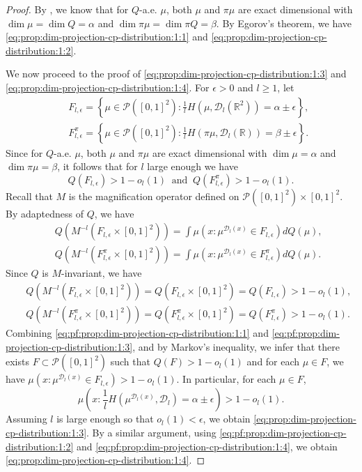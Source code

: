 \documentclass[a4paper,11pt]{amsart}
\theoremstyle{definition}
\numberwithin{equation}{section}
\def\D{\mathcal{D}}
\def\cP{\mathcal P}
\def\R{\mathbb R}
\begin{document}
\begin{proof}
By \cite[Theorem 1.22]{Hochman2010-fractal-distributions}, we know that for $Q$-a.e. $\mu$,  both $\mu$ and $\pi\mu$ are exact dimensional with $\dim \mu=\dim Q=\alpha$ and $\dim \pi\mu=\dim \pi Q=\beta$.   By Egorov's theorem, we have \eqref{eq:prop:dim-projection-cp-distribution:1:1} and \eqref{eq:prop:dim-projection-cp-distribution:1:2}. 

We now proceed to the proof of \eqref{eq:prop:dim-projection-cp-distribution:1:3} and \eqref{eq:prop:dim-projection-cp-distribution:1:4}.   For $\epsilon>0$ and $l\ge 1$, let 
\begin{eqnarray*}
& & F_{l,\epsilon} = \left\{ \mu\in \cP([0,1]^2): \frac{1}{l}H(\mu,\D_l(\R^2)) = \alpha\pm \epsilon  \right\},\\
& & F_{l,\epsilon}^\pi = \left\{ \mu\in \cP([0,1]^2): \frac{1}{l}H(\pi\mu,\D_l(\R)) = \beta\pm \epsilon  \right\}.
\end{eqnarray*}
Since for $Q$-a.e. $\mu$, both $\mu$ and $\pi\mu$ are exact dimensional with $\dim \mu=\alpha$ and $\dim \pi\mu=\beta$,  it follows that for $l$ large enough we have  
\[
Q(F_{l,\epsilon})>1-o_{l}(1) \  \textrm{ and }  \  Q(F_{l,\epsilon}^\pi)>1-o_{l}(1).
\]
Recall that $M$ is the magnification operator defined on $\cP([0,1]^2)\times [0,1]^2$.  By adaptedness of $Q$, we have
\begin{eqnarray}
& & Q\left(M^{-l}\left(F_{l,\epsilon}\times [0,1]^2\right)\right) = \int \mu\left(x: \mu^{\D_l(x)}\in F_{l,\epsilon}\right) d Q(\mu),  \label{eq:pf:prop:dim-projection-cp-distribution:1:1}\\
& & Q\left(M^{-l}\left(F_{l,\epsilon}^\pi\times [0,1]^2\right)\right) = \int \mu\left(x: \mu^{\D_l(x)}\in F_{l,\epsilon}^\pi\right) d Q(\mu).\label{eq:pf:prop:dim-projection-cp-distribution:1:2}
\end{eqnarray}
Since $Q$ is $M$-invariant, we have 
\begin{eqnarray}
& & Q\left(M^{-l}\left(F_{l,\epsilon}\times [0,1]^2\right)\right) =Q\left(F_{l,\epsilon}\times [0,1]^2\right)=Q\left(F_{l,\epsilon}\right)>1-o_l(1), \label{eq:pf:prop:dim-projection-cp-distribution:1:3}\\
& & Q\left(M^{-l}\left(F_{l,\epsilon}^\pi\times [0,1]^2\right)\right) = Q\left(F_{l,\epsilon}^\pi\times [0,1]^2\right)=Q\left(F_{l,\epsilon}^\pi\right)>1-o_l(1).\label{eq:pf:prop:dim-projection-cp-distribution:1:4}
\end{eqnarray}
Combining \eqref{eq:pf:prop:dim-projection-cp-distribution:1:1} and \eqref{eq:pf:prop:dim-projection-cp-distribution:1:3}, and by Markov's inequality,  we infer that there exists $F\subset \cP([0,1]^2)$ such that $Q(F)>1-o_{l}(1)$ and for each $\mu\in F$,  we have   $\mu\left(x: \mu^{\D_l(x)}\in F_{l,\epsilon}\right) > 1-o_{l}(1)$.  In particular,  for each $\mu\in F$,
\[
\mu\left( x: \frac{1}{l}H\left(\mu^{\D_l(x)},\D_l\right)  =  \alpha\pm \epsilon \right) > 1-o_l(1). 
\]
Assuming $l$ is large enough so that $o_l(1)<\epsilon$, we obtain \eqref{eq:prop:dim-projection-cp-distribution:1:3}.  By a similar argument,   using 
\eqref{eq:pf:prop:dim-projection-cp-distribution:1:2} and \eqref{eq:pf:prop:dim-projection-cp-distribution:1:4},  we obtain \eqref{eq:prop:dim-projection-cp-distribution:1:4}. 


\end{proof}
\end{document}
